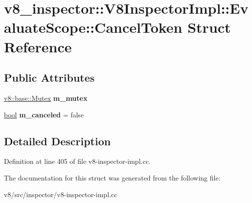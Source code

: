 \hypertarget{structv8__inspector_1_1V8InspectorImpl_1_1EvaluateScope_1_1CancelToken}{}\section{v8\+\_\+inspector\+:\+:V8\+Inspector\+Impl\+:\+:Evaluate\+Scope\+:\+:Cancel\+Token Struct Reference}
\label{structv8__inspector_1_1V8InspectorImpl_1_1EvaluateScope_1_1CancelToken}
\subsection*{Public Attributes}
\begin{DoxyCompactItemize}
\item 
\mbox{\label{structv8__inspector_1_1V8InspectorImpl_1_1EvaluateScope_1_1CancelToken_a08dde6995a3c6f3dcd37ad27d5707a13}} 
\mbox{\hyperlink{classv8_1_1base_1_1Mutex}{v8\+::base\+::\+Mutex}} {\bfseries m\+\_\+mutex}
\item 
\mbox{\label{structv8__inspector_1_1V8InspectorImpl_1_1EvaluateScope_1_1CancelToken_afa872e604daaa9d0d150e3fd54809e23}} 
\mbox{\hyperlink{classbool}{bool}} {\bfseries m\+\_\+canceled} = false
\end{DoxyCompactItemize}


\subsection{Detailed Description}


Definition at line 405 of file v8-\/inspector-\/impl.\+cc.



The documentation for this struct was generated from the following file\+:\begin{DoxyCompactItemize}
\item 
v8/src/inspector/v8-\/inspector-\/impl.\+cc\end{DoxyCompactItemize}
